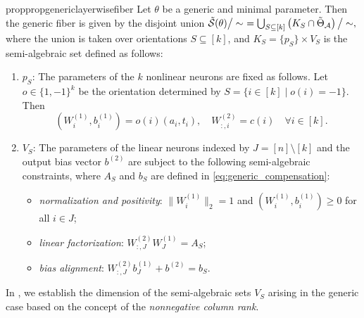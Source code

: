 \documentclass{article}
\theoremstyle{definition}
\newcommand{\architecture}{\mathcal{A}}
\newcommand{\gparamspace}[1]{\Tilde{\Theta}_{#1}}
\newcommand{\weights}[1]{W^{(#1)}}
\newcommand{\bias}[1]{b^{(#1)}}
\newcommand{\gfiber}[1]{\Tilde{\mathcal{S}}({#1})}
\newcommand{\modulo}[1]{\big/#1}
\begin{document}
\begin{restatable}{prop}{propgenericlayerwisefiber}
\label{prop:generic_layerwise_fiber}
Let $\theta$ be a generic and minimal parameter. 
Then the generic fiber is given by the disjoint union
$
\gfiber{\theta} \modulo{\sim} \ 
=
\bigcup_{S \subseteq [k]} \left(K_S \cap \gparamspace{\architecture}\right) \modulo{\sim},
$
where the union is taken over orientations $S \subseteq [k]$, and $K_S = \{p_S\} \times V_{S}$ is the semi-algebraic set defined as follows:
%
\begin{enumerate}[leftmargin=*] 
    \item $p_S$: 
    The parameters of the $k$ nonlinear neurons are fixed as follows. Let $o \in \{1,-1\}^k$ be the orientation determined by
    $
    S = \{i \in [k] \mid o(i)=-1\}.
    $
    Then
    \begin{equation}
        (\weights{1}_i, \bias{1}_i) = o(i)(a_i, t_i), \quad \weights{2}_{:,i} = c(i) \quad \forall i \in [k]. 
    \end{equation} 

    \item $V_{S}$: 
    The parameters of the linear neurons indexed by $J=[n]\setminus[k]$ and the output bias vector $\bias{2}$ are subject to the following semi-algebraic constraints, where $A_S$ and $b_S$ are defined in \eqref{eq:generic_compensation}:
    \begin{itemize}
        \item \emph{normalization and positivity}: $\|\weights{1}_i\|_2 = 1$ and $(\weights{1}_i, \bias{1}_i) \ge 0$ for all $i \in J$; 
        \item \emph{linear factorization}: $\weights{2}_{:,J} \weights{1}_J = A_S$; 
        \item \emph{bias alignment}: $\weights{2}_{:,J} \bias{1}_J + \bias{2} = b_S$. 
    \end{itemize}
\end{enumerate}
\end{restatable} 

In , we establish the dimension of the semi-algebraic sets $V_S$ arising in the generic case based on the concept of the \emph{nonnegative column rank}.
\end{document}
